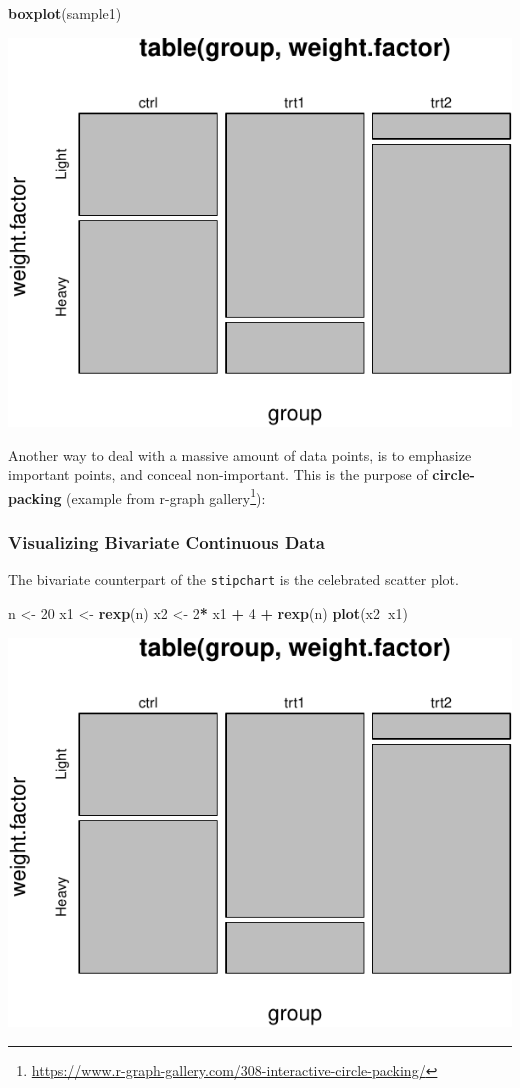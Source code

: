 \documentclass[]{book}
\newenvironment{Shaded}{\begin{snugshade}}{\end{snugshade}}
\newcommand{\DecValTok}[1]{\textcolor[rgb]{0.00,0.00,0.81}{#1}}
\newcommand{\KeywordTok}[1]{\textcolor[rgb]{0.13,0.29,0.53}{\textbf{#1}}}
\newcommand{\NormalTok}[1]{#1}
\newcommand{\OperatorTok}[1]{\textcolor[rgb]{0.81,0.36,0.00}{\textbf{#1}}}
\newcommand{\StringTok}[1]{\textcolor[rgb]{0.31,0.60,0.02}{#1}}
\renewcommand{\href}[2]{#2\footnote{\url{#1}}}
\theoremstyle{definition}
\theoremstyle{definition}
\theoremstyle{definition}
\theoremstyle{remark}
\begin{document}
\begin{Shaded}
\begin{Highlighting}[]
\KeywordTok{boxplot}\NormalTok{(sample1)    }
\end{Highlighting}
\end{Shaded}

\includegraphics[width=0.5\linewidth]{Rcourse_files/figure-latex/unnamed-chunk-136-1}

Another way to deal with a massive amount of data points, is to emphasize important points, and conceal non-important.
This is the purpose of \textbf{circle-packing} (example from \href{https://www.r-graph-gallery.com/308-interactive-circle-packing/}{r-graph gallery}):

\hypertarget{htmlwidget-68ba4bc22c69614c49b4}{}

\hypertarget{visualizing-bivariate-continuous-data}{%
\subsubsection{Visualizing Bivariate Continuous Data}\label{visualizing-bivariate-continuous-data}}

The bivariate counterpart of the \texttt{stipchart} is the celebrated scatter plot.

\begin{Shaded}
\begin{Highlighting}[]
\NormalTok{n <-}\StringTok{ }\DecValTok{20}
\NormalTok{x1 <-}\StringTok{ }\KeywordTok{rexp}\NormalTok{(n)}
\NormalTok{x2 <-}\StringTok{ }\DecValTok{2}\OperatorTok{*}\StringTok{ }\NormalTok{x1 }\OperatorTok{+}\StringTok{ }\DecValTok{4} \OperatorTok{+}\StringTok{ }\KeywordTok{rexp}\NormalTok{(n)}
\KeywordTok{plot}\NormalTok{(x2}\OperatorTok{~}\NormalTok{x1)}
\end{Highlighting}
\end{Shaded}

\includegraphics[width=0.5\linewidth]{Rcourse_files/figure-latex/unnamed-chunk-138-1}
\end{document}
